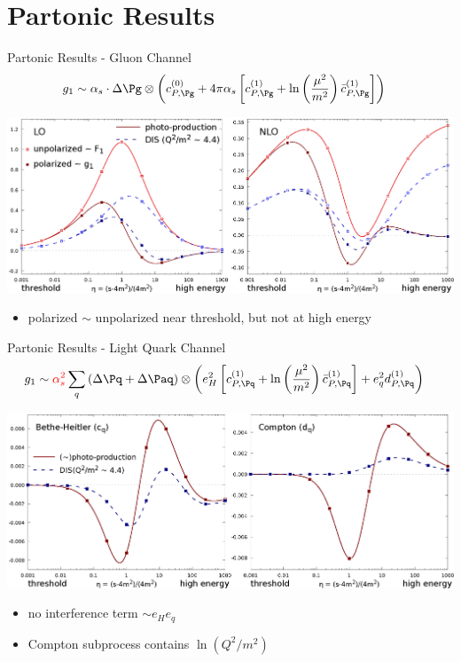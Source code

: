 \section{Partonic Results}
\begin{frame}{Partonic Results - Gluon Channel}
\begin{align*}
g_1 &\sim \alpha_s\cdot\Delta \Pg \otimes \left(c_{P,\Pg}^{(0)} + 4\pi\alpha_s\left[c_{P,\Pg}^{(1)} + \ln\left(\frac{\mu^2}{m^2}\right)\bar c_{P,\Pg}^{(1)}\right]\right)
\end{align*}
\begin{center}
\includegraphics[width=\textwidth]{img/cgTP-new}
\end{center}
\begin{itemize}
\item polarized $\sim$ unpolarized near threshold, but not at high energy
\end{itemize}
\end{frame}

\begin{frame}{Partonic Results - Light Quark Channel}
\begin{align*}
g_1 &\sim {\color{red}\alpha_s^2}\sum_{q}\left(\Delta \Pq+\Delta \Paq\right) \otimes \left(e_H^2\left[c_{P,\Pq}^{(1)} + \ln\left(\frac{\mu^2}{m^2}\right)\bar c_{P,\Pq}^{(1)}\right] + e_q^2 d_{P,\Pq}^{(1)}\right)
\end{align*}
\begin{center}
\includegraphics[width=.9\textwidth]{img/cdqP-new}
\end{center}
\begin{itemize}
\item no interference term $\sim e_He_q$
\item Compton subprocess contains $\ln(Q^2/m^2)$
\end{itemize}
\end{frame}

